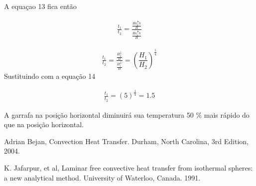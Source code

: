 \documentclass[12pt]{article}
\begin{document}
A equaçao 13 fica então

\begin{equation}
	\begin{aligned}
		\frac{t_{1} }{t_{2}}= \frac{\frac{Ra^{\frac{1}{4}}_{2}k}{H}}{\frac{Ra^{\frac{1}{4}}_{1}k}{H}}
	\end{aligned}
\end{equation}

\begin{equation}
	\begin{aligned}
		\frac{t_{1} }{t_{2}}= \frac{\frac{H^\frac{1}{4}_{2}}{H}}{\frac{H^\frac{1}{4}_{1}}{H}} = \left( \dfrac{H_{1}}{H_{2}}\right) ^{\frac{1}{4}}
	\end{aligned}
\end{equation}
Sustituindo com a equação 14


\begin{equation}
	\begin{aligned}
		\frac{t_{1} }{t_{2}} = \left( 5\right) ^{\frac{1}{4}} = 1.5
	\end{aligned}
\end{equation}

A garrafa na posição horizontal diminuirá sua temperatura 50 \% mais rápido do que na posição horizontal.


















\begin{thebibliography}{999}
	
	
	Adrian Bejan,
	Convection Heat Transfer.
	Durham, North Carolina,
	3rd Edition,
	2004.
	
	K. Jafarpur, et al,
	Laminar free convective heat transfer from
	isothermal spheres: a new analytical method.
	University of Waterloo, Canada.
	1991.
	
\end{thebibliography}
\end{document}
